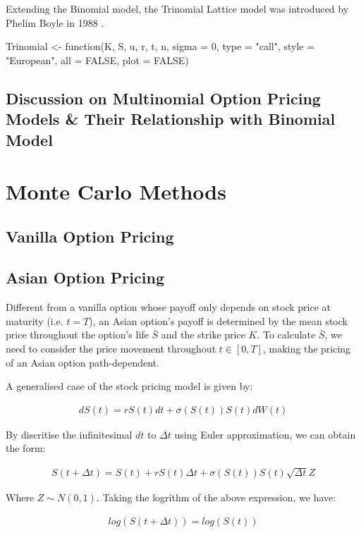 Extending the Binomial model, the Trinomial Lattice model was introduced by Phelim Boyle in 1988 \cite{Boyle1988}.

\begin{Rminted}
Trinomial <- function(K, S, u, r, t, n, sigma = 0,
    type = "call",
    style = "European",
    all = FALSE,
    plot = FALSE) {

}
\end{Rminted}

\subsection{Discussion on Multinomial Option Pricing Models \& Their Relationship with Binomial Model}

\newpage

\section{Monte Carlo Methods}

\subsection{Vanilla Option Pricing}

\subsection{Asian Option Pricing}

Different from a vanilla option whose payoff only depends on stock price at maturity (i.e. $t = T$), an Asian option's payoff is determined by the mean stock price throughout the option's life $\bar{S}$ and the strike price $K$. To calculate $\bar{S}$, we need to consider the price movement throughout $t \in [0, T]$, making the pricing of an Asian option path-dependent.


A generalised case of the stock pricing model is given by:

\begin{align}
    dS(t) = rS(t)dt + \sigma(S(t))S(t)dW(t)
\end{align}

By discritise the infinitesimal $dt$ to $\Delta t$ using Euler approximation, we can obtain the form:

\begin{align}
    S(t + \Delta t) = S(t) + rS(t)\Delta t + \sigma(S(t))S(t)\sqrt{\Delta t}Z
\end{align}

Where $Z \sim N(0,1)$. Taking the logrithm of the above expression, we have:

\begin{align}
    log(S(t + \Delta t)) = log(S(t))
\end{align}

\newpage